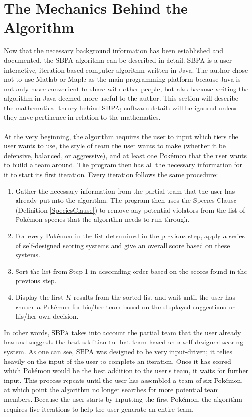 \documentclass{article}
\begin{document}
\section{The Mechanics Behind the Algorithm}
Now that the necessary background information has been established and documented, the SBPA algorithm can be described in detail. SBPA is a user interactive, iteration-based computer algorithm written in Java. The author chose not to use Matlab or Maple as the main programming platform because Java is not only more convenient to share with other people, but also because writing the algorithm in Java deemed more useful to the author. This section will describe the mathematical theory behind SBPA; software details will be ignored unless they have pertinence in relation to the mathematics.\\\\
At the very beginning, the algorithm requires the user to input which tiers the user wants to use, the style of team the user wants to make (whether it be defensive, balanced, or aggressive), and at least one Pok\'emon that the user wants to build a team around. The program then has all the necessary information for it to start its first iteration. Every iteration follows the same procedure:
\begin{enumerate}
	\item Gather the necessary information from the partial team that the user has already put into the algorithm. The program then uses the Species Clause (Definition \ref{SpeciesClause}) to remove any potential violators from the list of Pok\'emon species that the algorithm needs to run through.
	\item For every Pok\'emon in the list determined in the previous step, apply a series of self-designed scoring systems and give an overall score based on these systems.
	\item Sort the list from Step 1 in descending order based on the scores found in the previous step.
	\item Display the first $K$ results from the sorted list and wait until the user has chosen a Pok\'emon for his/her team based on the displayed suggestions or his/her own decision.
\end{enumerate}
In other words, SBPA takes into account the partial team that the user already has and suggests the best addition to that team based on a self-designed scoring system. As one can see, SBPA was designed to be very input-driven; it relies heavily on the input of the user to complete an iteration. Once it has scored which Pok\'emon would be the best addition to the user's team, it waits for further input. This process repeats until the user has assembled a team of six Pok\'emon, at which point the algorithm no longer searches for more potential team members. Because the user starts by inputting the first Pok\'emon, the algorithm requires five iterations to help the user generate an entire team.\\\\
\end{document}
